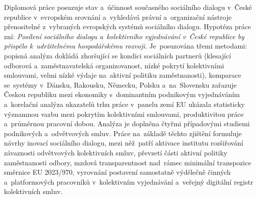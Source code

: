 Diplomová práce posuzuje stav a~účinnost současného sociálního dialogu v~České republice v~evropském srovnání a~vyhledává právní a~organizační nástroje přenositelné z~vybraných evropských systémů sociálního dialogu. Hypotéza práce zní: \emph{Posílení sociálního dialogu a~kolektivního vyjednávání v~České republice by přispělo k~udržitelnému hospodářskému rozvoji.} Je~posuzována třemi metodami: popisná analýza dokládá zhoršující se kondici sociálních partnerů (klesající odborová a~zaměstnavatelská organizovanost, nízké pokrytí kolektivními smlouvami, velmi nízké výdaje na~aktivní politiku zaměstnanosti), komparace se~systémy v~Dánsku, Rakousku, Německu, Polsku a~na~Slovensku zařazuje Českou republiku mezi ekonomiky s~dominantním podnikovým vyjednáváním a~korelační analýza ukazatelů trhu práce v~panelu zemí EU ukázala statisticky významnou vazbu mezi pokrytím kolektivními smlouvami, produktivitou práce a~průměrnou pracovní dobou. Analýza je doplněna čtyřmi případovými studiemi podnikových a~odvětvových smluv. Práce na~základě těchto zjištění formuluje návrhy inovací sociálního dialogu, mezi něž~patří aktivace institutu rozšiřování závaznosti odvětvových kolektivních smluv, převzetí části aktivní politiky zaměstnanosti odbory, mzdová transparentnost nad~rámec minimální transpozice směrnice EU 2023/970, vyrovnání postavení samostatně výdělečně činných a~platformových pracovníků v~kolektivním vyjednávání a~veřejný digitální registr kolektivních smluv.
